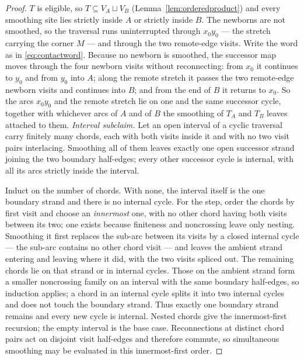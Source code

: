 \begin{proof}
$T$ is eligible, so $T\subseteq V_A\sqcup V_B$
(Lemma~\ref{lem:orderedproduct}) and every smoothing site lies strictly inside
$A$ or strictly inside $B$. The newborns are not smoothed, so the traversal
runs uninterrupted through $x_0y_0$ --- the stretch carrying the corner $M$ ---
and through the two remote-edge visits. Write the word as in \eqref{eq:contactword}. Because no newborn is smoothed, the
successor map moves through the four newborn visits without reconnecting: from
$x_0$ it continues to $y_0$ and from $y_0$ into $A$; along the remote stretch it
passes the two remote-edge newborn visits and continues into $B$; and from the
end of $B$ it returns to $x_0$. So the arcs $x_0y_0$ and the remote stretch lie
on one and the same successor cycle, together with whichever arcs of $A$ and of
$B$ the smoothing of $T_A$ and $T_B$ leaves attached to them. \emph{Interval subclaim.} Let an open interval of a cyclic traversal carry finitely many chords,
each with both visits inside it and with no two visit pairs interlacing. Smoothing all of them
leaves exactly one open successor strand joining the two boundary half-edges; every other
successor cycle is internal, with all its arcs strictly inside the interval.

Induct on the number of chords. With none, the interval itself is the one boundary strand and
there is no internal cycle. For the step, order the chords by first visit and choose an
\emph{innermost} one, with no other chord having both visits between its two; one exists because
finiteness and noncrossing leave only nesting. Smoothing it first replaces the sub-arc between
its visits by a closed internal cycle --- the sub-arc contains no other chord visit --- and leaves
the ambient strand entering and leaving where it did, with the two visits spliced out. The
remaining chords lie on that strand or in internal cycles. Those on the ambient strand form a
smaller noncrossing family on an interval with the same boundary half-edges, so induction
applies; a chord in an internal cycle splits it into two internal cycles and does not touch the
boundary strand. Thus exactly one boundary strand remains and every new cycle is internal.
Nested chords give the innermost-first recursion; the empty interval is the base case.
Reconnections at distinct chord pairs act on disjoint visit half-edges and therefore commute,
so simultaneous smoothing may be evaluated in this innermost-first order.


\end{proof}
